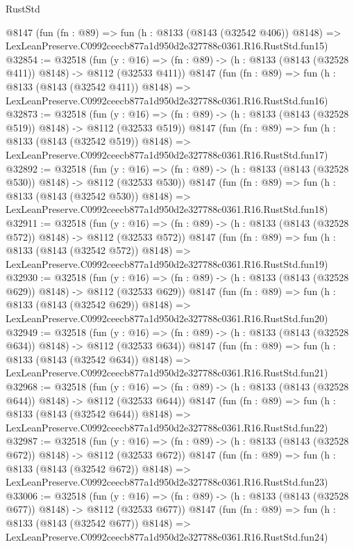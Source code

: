 \begin{lexlean}{RustStd}
\begin{coremodule}
    @8147
    (fun (fn : @89) =>
    fun (h : @8133 (@8143 (@32542 @406)) @8148) =>
    LexLeanPreserve.C0992ceecb877a1d950d2e327788c0361.R16.RustStd.fun15)
@32854 := @32518
    (fun (y : @16) => (fn : @89) -> (h : @8133 (@8143 (@32528 @411)) @8148) -> @8112 (@32533 @411))
    @8147
    (fun (fn : @89) =>
    fun (h : @8133 (@8143 (@32542 @411)) @8148) =>
    LexLeanPreserve.C0992ceecb877a1d950d2e327788c0361.R16.RustStd.fun16)
@32873 := @32518
    (fun (y : @16) => (fn : @89) -> (h : @8133 (@8143 (@32528 @519)) @8148) -> @8112 (@32533 @519))
    @8147
    (fun (fn : @89) =>
    fun (h : @8133 (@8143 (@32542 @519)) @8148) =>
    LexLeanPreserve.C0992ceecb877a1d950d2e327788c0361.R16.RustStd.fun17)
@32892 := @32518
    (fun (y : @16) => (fn : @89) -> (h : @8133 (@8143 (@32528 @530)) @8148) -> @8112 (@32533 @530))
    @8147
    (fun (fn : @89) =>
    fun (h : @8133 (@8143 (@32542 @530)) @8148) =>
    LexLeanPreserve.C0992ceecb877a1d950d2e327788c0361.R16.RustStd.fun18)
@32911 := @32518
    (fun (y : @16) => (fn : @89) -> (h : @8133 (@8143 (@32528 @572)) @8148) -> @8112 (@32533 @572))
    @8147
    (fun (fn : @89) =>
    fun (h : @8133 (@8143 (@32542 @572)) @8148) =>
    LexLeanPreserve.C0992ceecb877a1d950d2e327788c0361.R16.RustStd.fun19)
@32930 := @32518
    (fun (y : @16) => (fn : @89) -> (h : @8133 (@8143 (@32528 @629)) @8148) -> @8112 (@32533 @629))
    @8147
    (fun (fn : @89) =>
    fun (h : @8133 (@8143 (@32542 @629)) @8148) =>
    LexLeanPreserve.C0992ceecb877a1d950d2e327788c0361.R16.RustStd.fun20)
@32949 := @32518
    (fun (y : @16) => (fn : @89) -> (h : @8133 (@8143 (@32528 @634)) @8148) -> @8112 (@32533 @634))
    @8147
    (fun (fn : @89) =>
    fun (h : @8133 (@8143 (@32542 @634)) @8148) =>
    LexLeanPreserve.C0992ceecb877a1d950d2e327788c0361.R16.RustStd.fun21)
@32968 := @32518
    (fun (y : @16) => (fn : @89) -> (h : @8133 (@8143 (@32528 @644)) @8148) -> @8112 (@32533 @644))
    @8147
    (fun (fn : @89) =>
    fun (h : @8133 (@8143 (@32542 @644)) @8148) =>
    LexLeanPreserve.C0992ceecb877a1d950d2e327788c0361.R16.RustStd.fun22)
@32987 := @32518
    (fun (y : @16) => (fn : @89) -> (h : @8133 (@8143 (@32528 @672)) @8148) -> @8112 (@32533 @672))
    @8147
    (fun (fn : @89) =>
    fun (h : @8133 (@8143 (@32542 @672)) @8148) =>
    LexLeanPreserve.C0992ceecb877a1d950d2e327788c0361.R16.RustStd.fun23)
@33006 := @32518
    (fun (y : @16) => (fn : @89) -> (h : @8133 (@8143 (@32528 @677)) @8148) -> @8112 (@32533 @677))
    @8147
    (fun (fn : @89) =>
    fun (h : @8133 (@8143 (@32542 @677)) @8148) =>
    LexLeanPreserve.C0992ceecb877a1d950d2e327788c0361.R16.RustStd.fun24)

\end{coremodule}
\end{lexlean}
